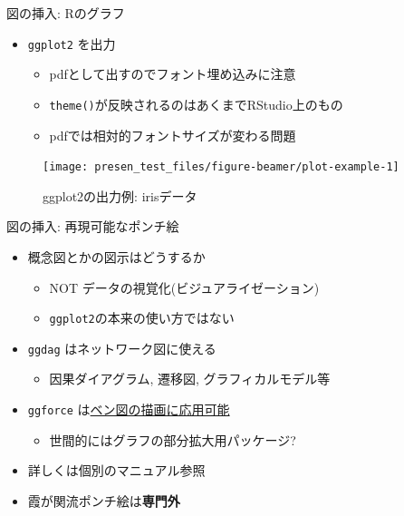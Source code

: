 \documentclass[
  14pt,
  ignorenonframetext,
]{beamer}
\providecommand{\tightlist}{%
  \setlength{\itemsep}{0pt}\setlength{\parskip}{0pt}}
\begin{document}
\begin{frame}[fragile]{図の挿入: Rのグラフ}
\protect\hypertarget{ux56f3ux306eux633fux5165-rux306eux30b0ux30e9ux30d5}{}

\begin{itemize}
\tightlist
\item
  \texttt{ggplot2} を出力

  \begin{itemize}
  \tightlist
  \item
    pdfとして出すのでフォント埋め込みに注意
  \item
    \texttt{theme()}が反映されるのはあくまでRStudio上のもの
  \item
    pdfでは相対的フォントサイズが変わる問題
  \end{itemize}
\end{itemize}

\begin{figure}

{\centering \texttt{[image: presen\_test\_files/figure-beamer/plot-example-1]} 

}

\caption{ggplot2の出力例: irisデータ}\label{fig:plot-example}
\end{figure}

\end{frame}

\begin{frame}[fragile]{図の挿入: 再現可能なポンチ絵}
\protect\hypertarget{ux56f3ux306eux633fux5165-ux518dux73feux53efux80fdux306aux30ddux30f3ux30c1ux7d75}{}

\begin{itemize}
\tightlist
\item
  概念図とかの図示はどうするか

  \begin{itemize}
  \tightlist
  \item
    NOT データの視覚化(ビジュアライゼーション)
  \item
    \texttt{ggplot2}の本来の使い方ではない
  \end{itemize}
\item
  \texttt{ggdag} はネットワーク図に使える

  \begin{itemize}
  \tightlist
  \item
    因果ダイアグラム, 遷移図, グラフィカルモデル等
  \end{itemize}
\item
  \texttt{ggforce}
  は\href{https://rpubs.com/sdutky/559050}{ベン図の描画に応用可能}

  \begin{itemize}
  \tightlist
  \item
    世間的にはグラフの部分拡大用パッケージ?
  \end{itemize}
\item
  詳しくは個別のマニュアル参照
\item
  霞が関流ポンチ絵は\textbf{専門外}
\end{itemize}

\end{frame}
\end{document}
